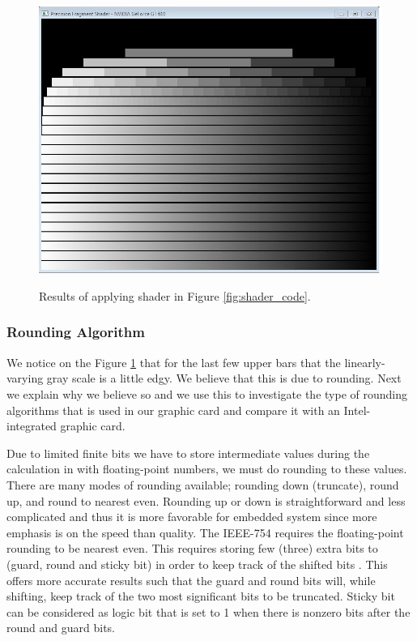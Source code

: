 \begin{figure}[t!]
 \centering   
    {\includegraphics[width=\linewidth]{fig/shader_gt610.JPG}} 
  \caption{Results of applying shader in Figure \ref{fig:shader_code}.}
   \label{fig:shader_fig}
\end{figure} 

\subsubsection{Rounding Algorithm}
We notice on the Figure \ref{fig:shader_fig} that for the last few upper bars that the linearly-varying gray scale is a little edgy. We believe that this is due to rounding. Next we explain why we believe so and we use this to investigate the type of rounding algorithms that is used in our graphic card and compare it with an Intel-integrated graphic card. 

Due to limited finite bits we have to store intermediate values during the calculation in with floating-point numbers, we must do rounding to these values. There are many modes of rounding available; rounding down (truncate), round up, and round to nearest even. Rounding up or down is straightforward and less complicated and thus it is more favorable for embedded system since more emphasis is on the speed than quality.  The IEEE-754 requires the floating-point rounding to be nearest even. This requires storing few (three) extra bits to (guard, round and sticky bit) in order to keep track of the shifted bits \cite{patterson2013computer}. This offers more accurate results such that the guard and round bits will, while shifting, keep track of the two most significant bits to be truncated. Sticky bit can be considered as logic bit that is set to 1 when there is nonzero bits after the round and guard bits. 

